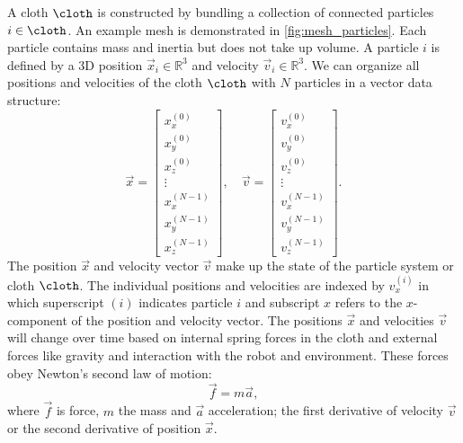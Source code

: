 \documentclass[\home/main.tex]{subfiles}
\begin{document}
A cloth $\cloth$ is constructed by bundling a collection of connected particles $i \in \cloth$. An example mesh is demonstrated in \cref{fig:mesh_particles}. Each particle contains mass and inertia but does not take up volume. A particle $i$ is defined by a 3D position $\vec{x}_i \in \mathbb{R}^3$ and velocity $\vec{v}_i \in \mathbb{R}^3$. We can organize all positions and velocities of the cloth $\cloth$ with $N$ particles in a vector data structure:
\begin{equation}
    \vec{x}=\left[\begin{array}{c}
            x^{(0)}_{x}   \\
            x^{(0)}_{y}   \\
            x^{(0)}_{z}   \\
            \vdots        \\
            x^{(N-1)}_{x} \\
            x^{(N-1)}_{y} \\
            x^{(N-1)}_{z}
        \end{array}
        \right], \quad \vec{v}=\left[\begin{array}{c}
            v^{(0)}_{x}   \\
            v^{(0)}_{y}   \\
            v^{(0)}_{z}   \\
            \vdots        \\
            v^{(N-1)}_{x} \\
            v^{(N-1)}_{y} \\
            v^{(N-1)}_{z}
        \end{array}\right].
\end{equation}
The position $\vec{x}$ and velocity vector $\vec{v}$ make up the state of the particle system or cloth $\cloth$. The individual positions and velocities are indexed by $v^{(i)}_{x}$ in which superscript $(i)$ indicates particle $i$ and subscript $x$ refers to the $x$-component of the position and velocity vector. The positions $\vec{x}$ and velocities $\vec{v}$ will change over time based on internal spring forces in the cloth and external forces like gravity and interaction with the robot and environment. These forces obey Newton's second law of motion:
\begin{equation}\label{eq:newton_second_law}
    \vec{f} = m\vec{a},
\end{equation}
where $\vec{f}$ is force, $m$ the mass and $\vec{a}$ acceleration; the first derivative of velocity $\vec{v}$ or the second derivative of position $\vec{x}$.
\end{document}
